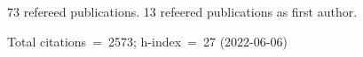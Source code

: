 73 refereed publications. 13 refeered publications as first author.

Total citations~=~2573; h-index~=~27 (2022-06-06)
